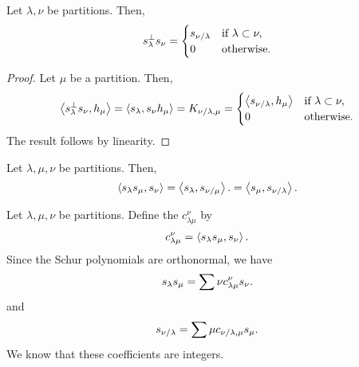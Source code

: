 \begin{theorem}
    Let \(\lambda, \nu\) be partitions.
    Then,
    \begin{equation}
        s_{\lambda}^\perp s_{\nu} =
        \begin{cases}
            s_{\nu / \lambda} & \text{if } \lambda \subset \nu, \\
            0 & \text{otherwise}.
        \end{cases}
    \end{equation}
\end{theorem}

\begin{proof}
    Let \(\mu\) be a partition.
    Then,
    \begin{equation}
        \left\langle s_{\lambda}^\perp s_{\nu}, h_\mu \right\rangle
        = \left\langle s_{\lambda}, s_{\nu} h_\mu \right\rangle
        = K_{\nu / \lambda, \mu}
        =
        \begin{cases}
            \left\langle s_{\nu / \lambda}, h_\mu \right\rangle & \text{if } \lambda \subset \nu, \\
            0 & \text{otherwise}.
        \end{cases}
    \end{equation}
    The result follows by linearity.
\end{proof}

\begin{corollary}
    Let \(\lambda, \mu, \nu\) be partitions.
    Then,
    \begin{equation}
        \left\langle s_{\lambda} s_{\mu}, s_{\nu} \right\rangle
        = \left\langle s_{\lambda}, s_{\nu / \mu} \right\rangle.
        = \left\langle s_{\mu}, s_{\nu / \lambda} \right\rangle.
    \end{equation}
\end{corollary}

Let \(\lambda, \mu, \nu\) be partitions.
Define the  \(c_{\lambda \mu}^\nu\) by
\begin{equation}
    c_{\lambda \mu}^\nu = \left\langle s_{\lambda} s_{\mu}, s_{\nu} \right\rangle.
\end{equation}
Since the Schur polynomials are orthonormal, we have
\begin{equation}
    s_{\lambda} s_{\mu} = \sum{\nu} c_{\lambda \mu}^\nu s_{\nu}.
\end{equation}
and
\begin{equation}
    s_{\nu / \lambda} = \sum{\mu} c_{\nu / \lambda, \mu} s_{\mu}.
\end{equation}
We know that these coefficients are integers.

